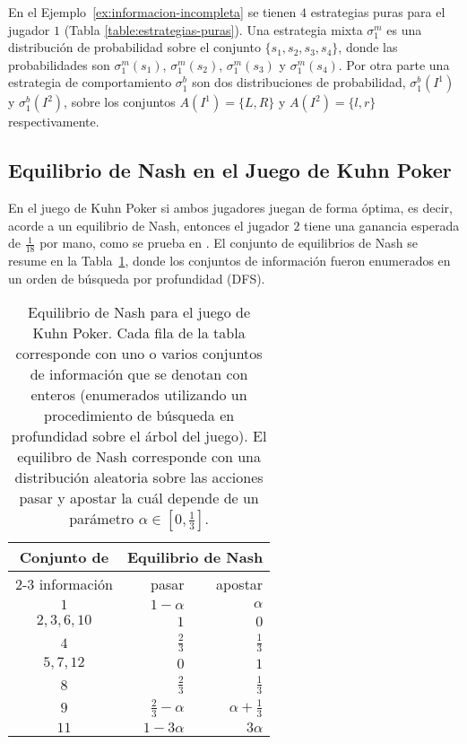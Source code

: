 En el Ejemplo~\ref{ex:informacion-incompleta} se tienen $4$ estrategias puras para el jugador $1$ (Tabla \ref{table:estrategias-puras}). Una estrategia mixta $\sigma^m_1$ es una distribución de probabilidad sobre el conjunto $\{s_1, s_2, s_3, s_4\}$, donde las probabilidades son $\sigma^m_1(s_1)$, $\sigma^m_1(s_2)$, $\sigma^m_1(s_3)$ y $\sigma^m_1(s_4)$. Por otra parte una estrategia de comportamiento $\sigma^b_1$ son dos distribuciones de probabilidad, $\sigma^b_1(I^1)$ y $\sigma^b_1(I^2)$, sobre los conjuntos $A(I^1) = \{L, R\}$ y $A(I^2) = \{l, r\}$ respectivamente.


\subsection*{Equilibrio de Nash en el Juego de Kuhn Poker}

En el juego de Kuhn Poker si ambos jugadores juegan de forma óptima, es decir, acorde a un equilibrio de Nash, entonces el jugador $2$ tiene una ganancia esperada de $\frac{1}{18}$ por mano, como se prueba en \cite{bib:kuhn-poker}. El conjunto de equilibrios de Nash se resume en la Tabla~\ref{tab:estrategia-kuhn-poker}, donde los conjuntos de información fueron enumerados en un orden de búsqueda por profundidad (DFS).

\begin{table}[h]
\begin{center}
    \caption{Equilibrio de Nash para el juego de Kuhn Poker. Cada fila de la tabla corresponde con uno o varios conjuntos de información que se denotan con enteros (enumerados utilizando un procedimiento de búsqueda en profundidad sobre el árbol del juego). El equilibro de Nash corresponde con una distribución aleatoria sobre las acciones pasar y apostar la cuál depende de un parámetro $\alpha \in \left[ 0,\frac{1}{3} \right]$.}
    \label{tab:estrategia-kuhn-poker}
    \begin{tabular}{c r r}
        \toprule
        \multirow{2}{*}{Conjunto de} & \multicolumn{2}{c}{Equilibrio de Nash}  \\ \cmidrule(l){2-3}
        información & pasar & apostar \\ 
        \midrule
         $1$ & $1-\alpha$ & $\alpha$ \\
         $2, 3, 6, 10$ & $1$ & $0$ \\
         $4$ & $\frac{2}{3}$ & $\frac{1}{3}$ \\
         $5, 7, 12$ & $0$ & $1$ \\
         $8$ & $\frac{2}{3}$ & $\frac{1}{3}$ \\
         $9$ & $\frac{2}{3} - \alpha$ & $\alpha + \frac{1}{3}$ \\
        $11$ & $1 - 3 \alpha$ & $3 \alpha$ \\ \bottomrule
    \end{tabular}
\end{center}
\end{table}

